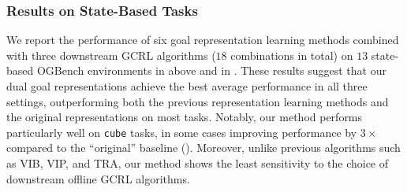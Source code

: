 \documentclass[final]{article} %
\theoremstyle{plain}
\theoremstyle{definition}
\theoremstyle{remark}
\renewcommand{\tt}[1]{\texttt{#1}}
\newcommand{\cutsubsectionup}{\vspace{-2pt}}
\newcommand{\cutsubsectiondown}{\vspace{-3pt}}
\begin{document}
\cutsubsectionup
\subsubsection{Results on State-Based Tasks}
\cutsubsectiondown
\label{sec:exp_state}
We report the performance of six goal representation learning methods
combined with three downstream GCRL algorithms ($18$ combinations in total)
on $13$ state-based OGBench environments
in  above and  in .
These results suggest that
our dual goal representations achieve the best average performance in all three settings,
outperforming both the previous representation learning methods and the original representations
on most tasks.
Notably, our method performs particularly well on \tt{cube} tasks,
in some cases improving performance by $3\times$ compared to the ``original'' baseline ().
Moreover, unlike previous algorithms such as VIB, VIP, and TRA,
our method shows the least sensitivity to the choice of downstream offline GCRL algorithms.
\end{document}
